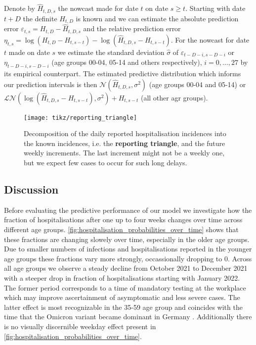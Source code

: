 Denote by \(\hat H_{t,D,s}\) the nowcast made for date \(t\) on date
\(s \geq t\). Starting with date \(t + D\) the definite \(H_{t,D}\) is
known and we can estimate the absolute prediction error
\(\varepsilon_{t,s} = H_{t,D} - \hat H_{t,D,s}\) and the relative
prediction error
\(\eta_{t,s} = \log \left( H_{t,D} - H_{t, s - t}\right) - \log \left( \hat H_{t,D,s} - H_{t, s- t} \right)\).
For the nowcast for date \(t\) made on date \(s\) we estimate the
standard deviation \(\hat\sigma\) of
\(\varepsilon_{t - D - i, s - D - i}\) or
\(\eta_{t - D - i, s - D - i}\) (age groups 00-04, 05-14 and others
respectively), \(i = 0, \dots, 27\) by its empirical counterpart. The
estimated predictive distribution which informs our prediction intervals
is then \(\mathcal N (\hat H_{t,D,s}, \sigma^2)\) (age groups 00-04 and
05-14) or
\(\mathcal{LN} \left( \log \left(\hat H_{t,D,s} - H_{t, s - t}\right), \sigma^2 \right) + H_{t, s - t}\)
(all other agr groups).

\begin{figure}
    \centering
    \texttt{[image: tikz/reporting\_triangle]}
    \caption{Decomposition of the daily reported hospitalisation incidences into the {\color{TUIl-orange} known incidences}, i.e. the \textbf{reporting triangle}, and {\color{TUIl-green}the future weekly increments}. {\color{TUIl-blue}The last increment} might not be a weekly one, but we expect few cases to occur for such long delays.}
    \label{fig:reporting_triangle}
\end{figure}

\subsection{Discussion}\label{subsec:nowcasting_discussion}
Before evaluating the predictive performance of our model we investigate
how the fraction of hospitalisations after one up to four weeks changes
over time across different age groups. 
\cref{fig:hospitalisation_probabilities_over_time} shows that these
fractions are changing slowely over time, especially in the older age
groups. Due to smaller numbers of infections and hospitalisations
reported in the younger age groups these fractions vary more strongly,
occassionally dropping to \(0\). Across all age groups we observe a
steady decline from October 2021 to December 2021 with a steeper drop in
fraction of hospitalisations starting with January 2022. The former
period corresponds to a time of mandatory testing at the workplace which
may improve ascertainment of asymptomatic and less severe cases. The
latter effect is most recognizable in the 35-59 age group and coincides
with the time that the Omicron variant became dominant in Germany
\cite{RobertKoch-Institut2022Lagebericht2022-01-20}. Additionally
there is no visually discernible weekday effect present in 
\cref{fig:hospitalisation_probabilities_over_time}.

